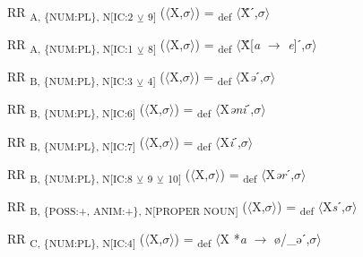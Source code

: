 {\begin{exe}
 RR \textsubscript{A, \{NUM:PL\}, N[IC:2} \textsubscript{${\veebar}$}\textsubscript{ 9]} ($\langle$X,$\sigma $$\rangle$) = \textsubscript{def} $\langle$Ẍˊ,$\sigma $$\rangle$
\end{exe}

\begin{exe}
 RR \textsubscript{A, \{NUM:PL\}, N[IC:1} \textsubscript{${\veebar}$}\textsubscript{ 8]} ($\langle$X,$\sigma $$\rangle$) = \textsubscript{def} $\langle$Ẍ[\textit{a} $\rightarrow$ \textit{e}]ˊ,$\sigma $$\rangle$
\end{exe}

\begin{exe}
 RR \textsubscript{B, \{NUM:PL\}, N[IC:3} \textsubscript{${\veebar}$}\textsubscript{ 4]} ($\langle$X,$\sigma $$\rangle$) = \textsubscript{def} $\langle$X\textit{ə}ˊ,$\sigma $$\rangle$
\end{exe}

\begin{exe}
 RR \textsubscript{B, \{NUM:PL\}, N[IC:6]} ($\langle$X,$\sigma $$\rangle$) = \textsubscript{def} $\langle$X\textit{əni}ˊ,$\sigma $$\rangle$
\end{exe}

\begin{exe}
 RR \textsubscript{B, \{NUM:PL\}, N[IC:7]} ($\langle$X,$\sigma $$\rangle$) = \textsubscript{def} $\langle$X\textit{i}ˊ,$\sigma $$\rangle$
\end{exe}

\begin{exe}
 RR \textsubscript{B, \{NUM:PL\}, N[IC:8} \textsubscript{${\veebar}$}\textsubscript{ 9} \textsubscript{${\veebar}$}\textsubscript{ 10]} ($\langle$X,$\sigma $$\rangle$) = \textsubscript{def} $\langle$X\textit{ər}ˊ,$\sigma $$\rangle$
\end{exe}

\begin{exe}
 RR \textsubscript{B, \{POSS:+, ANIM:+\}, N[}\textsubscript{PROPER NOUN}\textsubscript{]} ($\langle$X,$\sigma $$\rangle$) = \textsubscript{def} $\langle$X\textit{s}ˊ,$\sigma $$\rangle$
\end{exe}

\begin{exe}
 RR \textsubscript{C, \{NUM:PL\}, N[IC:4]} ($\langle$X,$\sigma $$\rangle$) = \textsubscript{def} $\langle$X *\textit{a} $\rightarrow$ ø/\_əˊ,$\sigma $$\rangle$
\end{exe}

}
